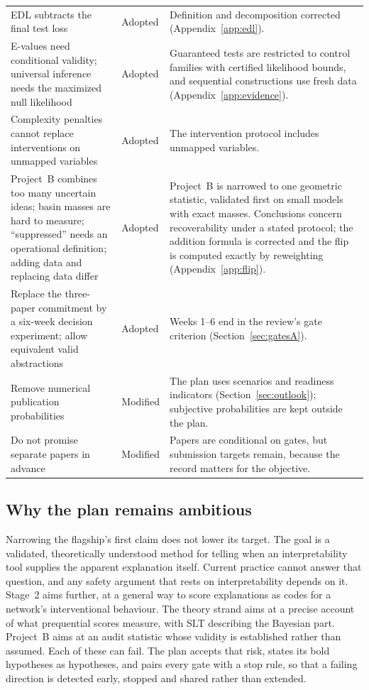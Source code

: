 \documentclass[11pt,a4paper]{article}
\begin{document}
\begin{longtable}{@{}P{5.0cm}P{1.9cm}P{7.8cm}@{}}
EDL subtracts the final test loss & Adopted & Definition and decomposition
corrected (Appendix~\ref{app:edl}). \\ \addlinespace
E-values need conditional validity; universal inference needs the
maximized null likelihood & Adopted & Guaranteed tests are restricted to
control families with certified likelihood bounds, and sequential
constructions use fresh data (Appendix~\ref{app:evidence}). \\ \addlinespace
Complexity penalties cannot replace interventions on unmapped variables &
Adopted & The intervention protocol includes unmapped variables. \\
\addlinespace
Project~B combines too many uncertain ideas; basin masses are hard to
measure; ``suppressed'' needs an operational definition; adding data and
replacing data differ & Adopted & Project~B is narrowed to one geometric
statistic, validated first on small models with exact masses. Conclusions
concern recoverability under a stated protocol; the addition formula is
corrected and the flip is computed exactly by reweighting
(Appendix~\ref{app:flip}). \\ \addlinespace
Replace the three-paper commitment by a six-week decision experiment;
allow equivalent valid abstractions & Adopted & Weeks 1--6 end in the
review's gate criterion (Section~\ref{sec:gatesA}). \\ \addlinespace
Remove numerical publication probabilities & Modified & The plan uses
scenarios and readiness indicators (Section~\ref{sec:outlook});
subjective probabilities are kept outside the plan. \\ \addlinespace
Do not promise separate papers in advance & Modified & Papers are
conditional on gates, but submission targets remain, because the record
matters for the objective. \\
\bottomrule
\end{longtable}

\subsection{Why the plan remains ambitious}

Narrowing the flagship's first claim does not lower its target. The goal
is a validated, theoretically understood method for telling when an
interpretability tool supplies the apparent explanation itself. Current
practice cannot answer that question, and any safety argument that rests
on interpretability depends on it. Stage~2 aims further, at a general way
to score explanations as codes for a network's interventional behaviour.
The theory strand aims at a precise account of what prequential scores
measure, with SLT describing the Bayesian part. Project~B aims at an audit
statistic whose validity is established rather than assumed. Each of these
can fail. The plan accepts that risk, states its bold hypotheses as
hypotheses, and pairs every gate with a stop rule, so that a failing direction is detected early, stopped and shared rather than extended.
\end{document}

